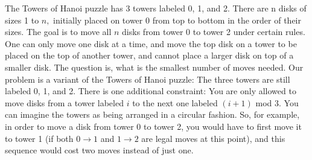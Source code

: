 \documentclass[12pt]{article}
\begin{document}

The Towers of Hanoi puzzle has 3 towers labeled 0, 1, and 2. There are n disks of sizes 1 to $n,$ initially placed on tower 0 from top to bottom in the order of their sizes. The goal is to move all $n$ disks from tower 0 to tower 2 under certain rules. One can only move one disk at a time, and move the top disk on a tower to be placed on the top of another tower, and cannot place a larger disk on top of a smaller disk. The question is, what is the smallest number of moves needed. Our problem is a variant of the Towers of Hanoi puzzle: The three towers are still labeled 0, 1, and 2. There is one additional constraint: You are only allowed to move disks from a tower labeled $i$ to the next one labeled $(i+1)$ mod 3. You can imagine the towers as being arranged in a circular fashion. So, for example, in order to move a disk from tower 0 to tower 2, you would have to first move it to tower 1 (if both $0 \rightarrow 1$ and $1 \rightarrow 2$ are legal moves at this point), and this sequence would cost two moves instead of just one.
\end{document}
